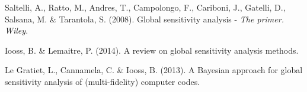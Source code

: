 \begin{thebibliography}{94}
 Saltelli, A., Ratto, M., Andres, T., Campolongo, F., Cariboni, J.,  Gatelli, D., Salsana, M. \& Tarantola, S. (2008). Global sensitivity analysis - {\it The primer. Wiley}.

 Iooss, B. \&  Lemaitre, P. (2014). A review on global sensitivity analysis methods. {\it}

  Le Gratiet, L., Cannamela, C. \& Iooss, B. (2013). A Bayesian approach for global sensitivity analysis of (multi-fidelity) computer codes.


\end{thebibliography}{}




